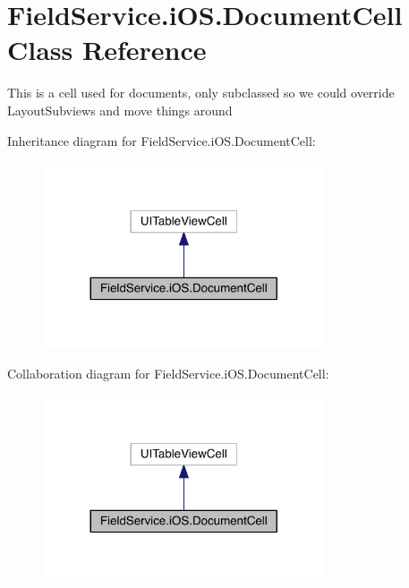 \hypertarget{class_field_service_1_1i_o_s_1_1_document_cell}{\section{Field\+Service.\+i\+O\+S.\+Document\+Cell Class Reference}
\label{class_field_service_1_1i_o_s_1_1_document_cell}
}


This is a cell used for documents, only subclassed so we could override Layout\+Subviews and move things around  




Inheritance diagram for Field\+Service.\+i\+O\+S.\+Document\+Cell\+:
\nopagebreak
\begin{figure}[H]
\begin{center}
\leavevmode
\includegraphics[width=236pt]{class_field_service_1_1i_o_s_1_1_document_cell__inherit__graph}
\end{center}
\end{figure}


Collaboration diagram for Field\+Service.\+i\+O\+S.\+Document\+Cell\+:
\nopagebreak
\begin{figure}[H]
\begin{center}
\leavevmode
\includegraphics[width=236pt]{class_field_service_1_1i_o_s_1_1_document_cell__coll__graph}
\end{center}
\end{figure}
